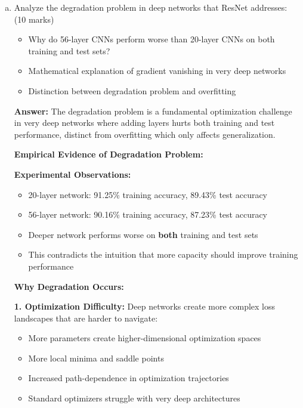 \documentclass[12pt]{article}
\newcommand{\answer}[1]{{\color{answercolor}\textbf{Answer:} #1}}
\newcommand{\explanation}[1]{{\color{explanationcolor}#1}}
\begin{document}
\begin{enumerate}[(a)]
    \item Analyze the degradation problem in deep networks that ResNet addresses: \hfill (10 marks)
    \begin{itemize}
        \item Why do 56-layer CNNs perform worse than 20-layer CNNs on both training and test sets?
        \item Mathematical explanation of gradient vanishing in very deep networks
        \item Distinction between degradation problem and overfitting
    \end{itemize}
    
    \answer{The degradation problem is a fundamental optimization challenge in very deep networks where adding layers hurts both training and test performance, distinct from overfitting which only affects generalization.}
    
    \explanation{
    \textbf{Empirical Evidence of Degradation Problem:}
    
    \textbf{Experimental Observations:}
    \begin{itemize}
        \item 20-layer network: 91.25\% training accuracy, 89.43\% test accuracy  
        \item 56-layer network: 90.16\% training accuracy, 87.23\% test accuracy
        \item Deeper network performs worse on \textbf{both} training and test sets
        \item This contradicts the intuition that more capacity should improve training performance
    \end{itemize}
    
    \textbf{Why Degradation Occurs:}
    
    \textbf{1. Optimization Difficulty:}
    Deep networks create more complex loss landscapes that are harder to navigate:
    \begin{itemize}
        \item More parameters create higher-dimensional optimization spaces
        \item More local minima and saddle points
        \item Increased path-dependence in optimization trajectories
        \item Standard optimizers struggle with very deep architectures
    \end{itemize}
    
}
\end{enumerate}
\end{document}

